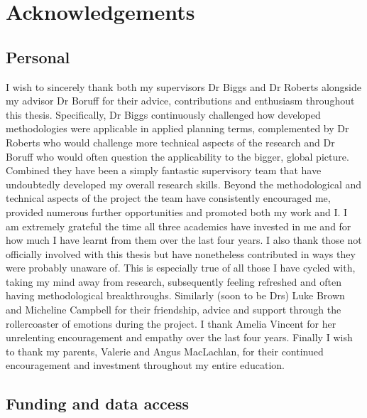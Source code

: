 \documentclass[]{book}
\begin{document}
\chapter*{Acknowledgements}\label{acknowledgements}

\section*{Personal}\label{personal}

I wish to sincerely thank both my supervisors Dr Biggs and Dr Roberts
alongside my advisor Dr Boruff for their advice, contributions and
enthusiasm throughout this thesis. Specifically, Dr Biggs continuously
challenged how developed methodologies were applicable in applied
planning terms, complemented by Dr Roberts who would challenge more
technical aspects of the research and Dr Boruff who would often question
the applicability to the bigger, global picture. Combined they have been
a simply fantastic supervisory team that have undoubtedly developed my
overall research skills. Beyond the methodological and technical aspects
of the project the team have consistently encouraged me, provided
numerous further opportunities and promoted both my work and I. I am
extremely grateful the time all three academics have invested in me and
for how much I have learnt from them over the last four years. I also
thank those not officially involved with this thesis but have
nonetheless contributed in ways they were probably unaware of. This is
especially true of all those I have cycled with, taking my mind away
from research, subsequently feeling refreshed and often having
methodological breakthroughs. Similarly (soon to be Drs) Luke Brown and
Micheline Campbell for their friendship, advice and support through the
rollercoaster of emotions during the project. I thank Amelia Vincent for
her unrelenting encouragement and empathy over the last four years.
Finally I wish to thank my parents, Valerie and Angus MacLachlan, for
their continued encouragement and investment throughout my entire
education.

\section*{Funding and data access}\label{funding-and-data-access}
\end{document}
